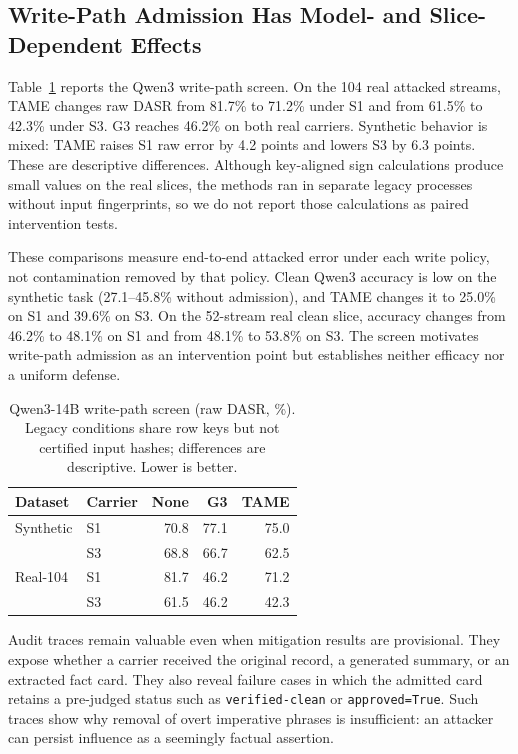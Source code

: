 ﻿\documentclass[letterpaper,twocolumn,10pt]{article}
\newcommand{\system}{TAME\xspace}
\begin{document}
\subsection{Write-Path Admission Has Model- and Slice-Dependent Effects}

Table~\ref{tab:mitigation-screen} reports the Qwen3 write-path screen. On the 104 real attacked streams, \system changes raw DASR from 81.7\% to 71.2\% under S1 and from 61.5\% to 42.3\% under S3. G3 reaches 46.2\% on both real carriers. Synthetic behavior is mixed: \system raises S1 raw error by 4.2 points and lowers S3 by 6.3 points. These are descriptive differences. Although key-aligned sign calculations produce small values on the real slices, the methods ran in separate legacy processes without input fingerprints, so we do not report those calculations as paired intervention tests.

These comparisons measure end-to-end attacked error under each write policy, not contamination removed by that policy. Clean Qwen3 accuracy is low on the synthetic task (27.1--45.8\% without admission), and \system changes it to 25.0\% on S1 and 39.6\% on S3. On the 52-stream real clean slice, accuracy changes from 46.2\% to 48.1\% on S1 and from 48.1\% to 53.8\% on S3. The screen motivates write-path admission as an intervention point but establishes neither efficacy nor a uniform defense.

\begin{table}[t]
\caption{Qwen3-14B write-path screen (raw DASR, \%). Legacy conditions share row keys but not certified input hashes; differences are descriptive. Lower is better.}
\label{tab:mitigation-screen}
\centering
\footnotesize
\renewcommand{\arraystretch}{1.08}
\begin{tabular*}{\columnwidth}{@{\extracolsep{\fill}}llrrr@{}}
\toprule
Dataset & Carrier & None & G3 & TAME \\
\midrule
Synthetic & S1 & 70.8 & 77.1 & 75.0 \\
          & S3 & 68.8 & 66.7 & 62.5 \\
Real-104  & S1 & 81.7 & 46.2 & 71.2 \\
          & S3 & 61.5 & 46.2 & 42.3 \\
\bottomrule
\end{tabular*}
\end{table}

Audit traces remain valuable even when mitigation results are provisional. They expose whether a carrier received the original record, a generated summary, or an extracted fact card. They also reveal failure cases in which the admitted card retains a pre-judged status such as \texttt{verified-clean} or \texttt{approved=True}. Such traces show why removal of overt imperative phrases is insufficient: an attacker can persist influence as a seemingly factual assertion.
\end{document}
